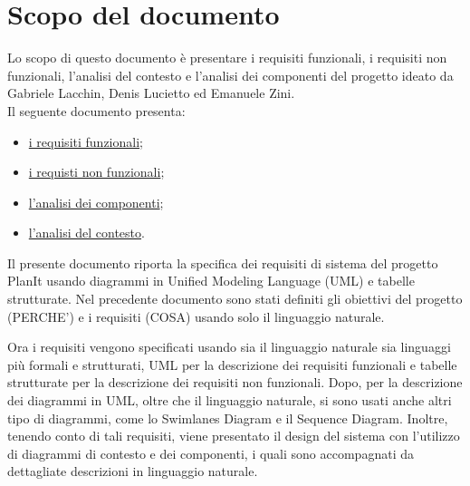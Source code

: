 \section*{Scopo del documento}
Lo scopo di questo documento è presentare i requisiti funzionali, i requisiti non funzionali, l'analisi del contesto e l'analisi dei componenti del progetto \nome ideato da Gabriele Lacchin, Denis Lucietto ed Emanuele Zini.\\
Il seguente documento presenta:
\begin{itemize}
    \item \hyperref[secD2:RequisitiFunzionali]{i requisiti funzionali};
    \item \hyperref[secD2:RequisitiNonFunzionali]{i requisti non funzionali};
    \item \hyperref[secD2:AnalisiDeiComponenti]{l'analisi dei componenti};
    \item \hyperref[secD2:AnalisiDelContesto]{l'analisi del contesto}.
\end{itemize}


Il presente documento riporta la specifica dei requisiti di sistema del progetto PlanIt usando diagrammi in Unified Modeling Language (UML) e tabelle strutturate. Nel precedente documento sono stati definiti gli obiettivi del progetto (PERCHE') e i requisiti (COSA) usando solo il linguaggio naturale.

Ora i requisiti vengono specificati usando sia il linguaggio naturale sia linguaggi più formali e strutturati, UML per la descrizione dei requisiti funzionali e tabelle strutturate per la descrizione dei requisiti non funzionali. Dopo, per la descrizione dei diagrammi in UML, oltre che il linguaggio naturale, si sono usati anche altri tipo di diagrammi, come lo Swimlanes Diagram e il Sequence Diagram. Inoltre, tenendo conto di tali requisiti, viene presentato il design del sistema con l'utilizzo di diagrammi di contesto e dei componenti, i quali sono accompagnati da dettagliate descrizioni in linguaggio naturale.
